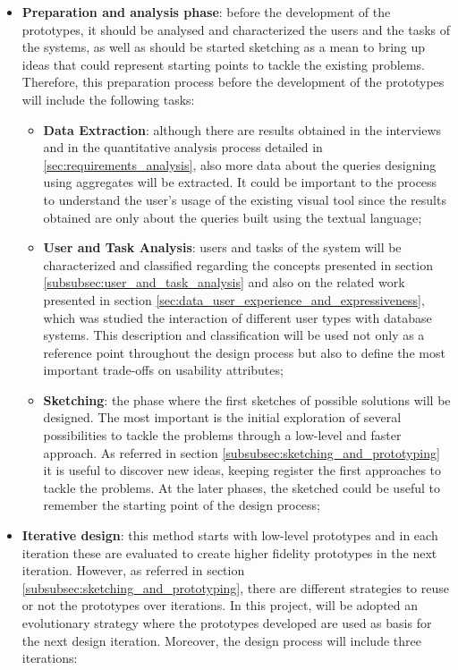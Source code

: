 \begin{itemize}
    \item \textbf{Preparation and analysis phase}: before the development of the prototypes, it should be analysed and characterized the users and the tasks of the systems, as well as should be started sketching as a mean to bring up ideas that could represent starting points to tackle the existing problems. Therefore, this preparation process before the development of the prototypes will include the following tasks:
    \begin{itemize}
        \item \textbf{Data Extraction}: although there are results obtained in the interviews and in the quantitative analysis process detailed in \ref{sec:requirements_analysis}, also more data about the queries designing using aggregates will be extracted. It could be important to the process to understand the user's usage of the existing visual tool since the results obtained are only about the queries built using the textual language;
        \item \textbf{User and Task Analysis}: users and tasks of the system will be characterized and classified regarding the concepts presented in section \ref{subsubsec:user_and_task_analysis} and also on the related work presented in section \ref{sec:data_user_experience_and_expressiveness}, which was studied the interaction of different user types with database systems. This description and classification will be used not only as a reference point throughout the design process but also to define the most important trade-offs on usability attributes;
        \item \textbf{Sketching}: the phase where the first sketches of possible solutions will be designed. The most important is the initial exploration of several possibilities to tackle the problems through a low-level and faster approach. As referred in section \ref{subsubsec:sketching_and_prototyping} it is useful to discover new ideas, keeping register the first approaches to tackle the problems. At the later phases, the sketched could be useful to remember the starting point of the design process;
    \end{itemize}
    \item \textbf{Iterative design}: this method starts with low-level prototypes and in each iteration these are evaluated to create higher fidelity prototypes in the next iteration. However, as referred in section \ref{subsubsec:sketching_and_prototyping}, there are different strategies to reuse or not the prototypes over iterations. In this project, will be adopted an evolutionary strategy where the prototypes developed are used as basis for the next design iteration. Moreover, the design process will include three iterations:

\end{itemize}
